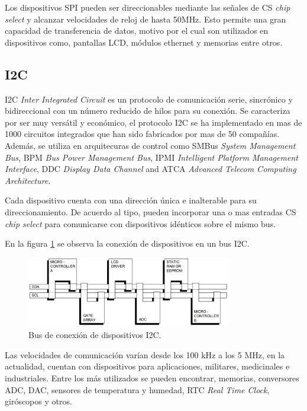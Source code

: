 Los dispositivos SPI pueden ser direccionables mediante las señales de CS \textit{chip select} y alcanzar velocidades de reloj de hasta 50MHz. Esto permite una gran capacidad de transferencia de datos, motivo por el cual son utilizados en dispositivos como, pantallas LCD, módulos ethernet y memorias entre otros. 


\subsection{I2C}

I2C \textit{Inter Integrated Circuit} es un protocolo de comunicación serie, sincrónico y bidireccional con un número reducido de hilos para su conexión. Se caracteriza por ser muy versátil y económico, el protocolo I2C se ha implementado en mas de 1000 circuitos integrados que han sido fabricados por mas de 50 compañías. Además, se utiliza en arquitecuras de control como SMBus   \textit{System Management Bus}, BPM    \textit{Bus Power Management Bus}, IPMI   \textit{Intelligent Platform Management Interface}, DDC   \textit{Display Data Channel} and ATCA   \textit{Advanced Telecom Computing Architecture}\citep{nxp}.

Cada dispositivo cuenta con una dirección única e inalterable para su direccionamiento. De acuerdo al tipo, pueden incorporar una o mas entradas CS \textit{chip select} para comunicarse con dispositivos idénticos sobre el mismo bus.

En la figura \ref{fig:I2C} se observa la conexión de dispositivos en un bus I2C.

\begin{figure}[htbp]
	\centering
	\includegraphics[width=0.8\textwidth]{./Figures/I2C.png}
	\caption{Bus de conexión de dispositivos I2C.}
	\label{fig:I2C}
\end{figure} 

Las velocidades de comunicación varían desde los 100 kHz a los 5 MHz, en la actualidad, cuentan con dispositivos para aplicaciones, militares, medicinales e industriales. Entre los más utilizados se pueden encontrar, memorias, conversores ADC, DAC, sensores de temperatura y humedad, RTC \textit{Real Time Clock}, giróscopos y otros.

